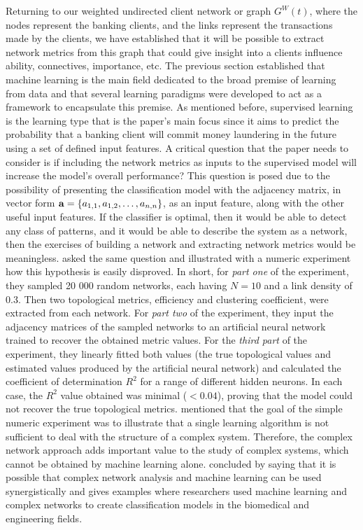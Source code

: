 Returning to our weighted undirected client network or graph $G^W(t)$, where the nodes represent the banking clients, and the links represent the transactions made by the clients, we have established that it will be possible to extract network metrics from this graph that could give insight into  a clients influence ability, connectives, importance, etc. The previous section established that machine learning is the main field dedicated to the broad premise of learning from data and that several learning paradigms were developed to act as a framework to encapsulate this premise. As mentioned before, supervised learning is the learning type that is the paper's main focus since it aims to predict the probability that a banking client will commit money laundering in the future using a set of defined input features. A critical question that the paper needs to consider is if including the network metrics as inputs to the supervised model will increase the model's overall performance? This question is posed due to the possibility of presenting the classification model with the adjacency matrix, in vector form $\bold{a} = \{a_{1,1}, a_{1,2}, \ldots, a_{n,n} \}$, as an input feature, along with the other useful input features. If the classifier is optimal, then it would be able to detect any class of patterns, and it would be able to describe the system as a network, then the exercises of building a network and extracting network metrics would be meaningless. \citet*{zanin2016combining} asked the same question and illustrated with a numeric experiment how this hypothesis is easily disproved. In short, for \textit{part one} of the experiment, they sampled 20 000 random networks, each having $N = 10$ and a link density of 0.3. Then two topological metrics, efficiency and clustering coefficient, were extracted from each network. For \textit{part two} of the experiment, they input the adjacency matrices of the sampled networks to an artificial neural network trained to recover the obtained metric values. For the \textit{third part} of the experiment, they linearly fitted both values (the true topological values and estimated values produced by the artificial neural network) and calculated the coefficient of determination $R^2$ for a range of different hidden neurons. In each case, the $R^2$ value obtained was minimal ($<0.04$), proving that the model could not recover the true topological metrics. \citet{zanin2016combining} mentioned that the goal of the simple numeric experiment was to illustrate that a single learning algorithm is not sufficient to deal with the structure of a complex system. Therefore, the complex network approach adds important value to the study of complex systems, which cannot be obtained by machine learning alone. \citet{zanin2016combining} concluded by saying that it is possible that complex network analysis and machine learning can be used synergistically and gives examples where researchers used machine learning and complex networks to create classification models in the biomedical and engineering fields. 

